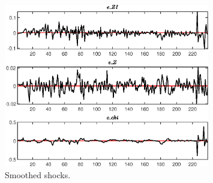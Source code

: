  
\begin{figure}[H]
\centering 
\includegraphics[width=0.80\textwidth]{two_sector_RBC_fixed_cost/graphs/two_sector_RBC_fixed_cost_SmoothedShocks1}
\caption{Smoothed shocks.}\label{Fig:SmoothedShocks:1}
\end{figure}


